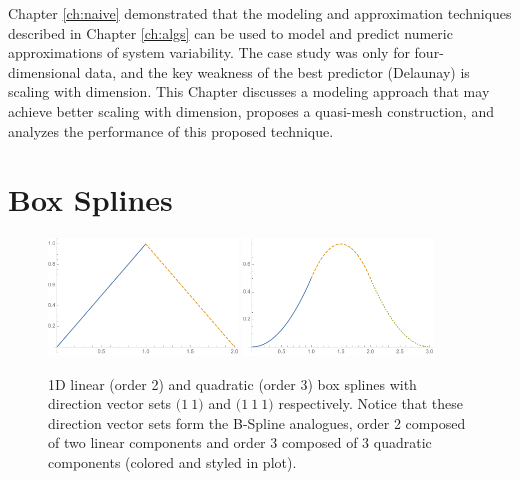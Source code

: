 Chapter \ref{ch:naive} demonstrated that the modeling and
approximation techniques described in Chapter \ref{ch:algs} can be
used to model and predict numeric approximations of system
variability. The case study was only for four-dimensional data, and
the key weakness of the best predictor (Delaunay) is scaling with
dimension. This Chapter discusses a modeling approach that may achieve
better scaling with dimension, proposes a quasi-mesh construction, and
analyzes the performance of this proposed technique.


\section{Box Splines}
\label{sec_box_splines}

\begin{figure}
  \centering
  \includegraphics[width=0.45\textwidth]{Figures/ACM/1D-linear.pdf}
  \includegraphics[width=0.45\textwidth]{Figures/ACM/1D-quadratic.pdf}
  \caption{1D linear (order 2) and quadratic (order 3) box splines with direction vector sets $\bigl( 1 \ 1 \bigr)$ and $\bigl( 1 \ 1 \ 1 \bigr)$ respectively. Notice that these direction vector sets form the B-Spline analogues, order 2 composed of two linear components and order 3 composed of 3 quadratic components (colored and styled in plot).}
  \label{fig_1D_boxes}
\end{figure}

